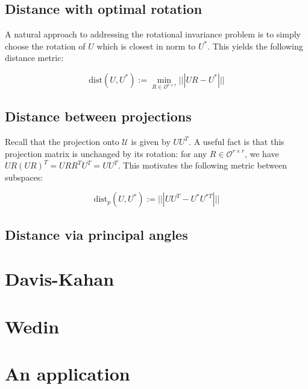 \documentclass{amsart}
\newcommand{\dist}{\textrm{dist}}
\newcommand{\calU}{\mathcal{U}}
\newcommand{\calO}{\mathcal{O}}
\begin{document}
\subsection{Distance with optimal rotation}

A natural approach to addressing the rotational invariance problem is to simply choose the rotation of $U$ which is
closest in norm to $U^{*}$. This yields the following distance metric:

$$\dist(U, U^{*}) := \min_{R \in \calO^{r \times r}}|||UR - U^{*}|||$$

\subsection{Distance between projections}

Recall that the projection onto $\calU$ is given by $UU^{T}$. A useful fact is that this projection matrix is unchanged by its rotation: for any $R \in \calO^{r \times r}$, we have $UR(UR)^{T} = URR^{T}U^{T} = UU^{T}$. This motivates the following metric between subspaces:

$$\dist_{p}(U, U^{*}) := |||UU^{T} - U^{*}U^{*T}|||$$

\subsection{Distance via principal angles}


\section{Davis-Kahan}

\section{Wedin}

\section{An application}




\end{document}
